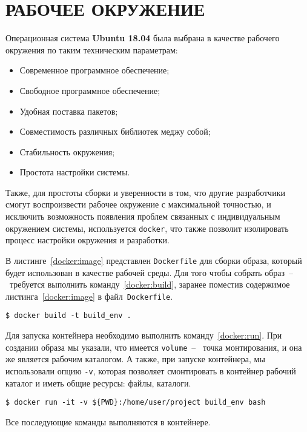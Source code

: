 \chapter{РАБОЧЕЕ ОКРУЖЕНИЕ}


Операционная система \textbf{Ubuntu 18.04} была выбрана в качестве рабочего
окружения по таким техническим параметрам:

\begin{itemize}
    \item Современное программное обеспечение;
    \item Свободное программное обеспечение;
    \item Удобная поставка пакетов;
    \item Совместимость различных библиотек меджу собой;
    \item Стабильность окружения;
    \item Простота настройки системы.
\end{itemize}

Также, для простоты сборки и уверенности в том, что другие разработчики смогут
воспроизвести рабочее окружение с максимальной точностью, и исключить
возможность появления проблем связанных с индивидуальным окружением системы,
используется \texttt{docker}, что также позволит изолировать процесс настройки
окружения и разработки.

В листинге~\ref{docker:image} представлен \texttt{Dockerfile} для сборки образа,
который будет использован в качестве рабочей среды. Для того чтобы собрать
образ~--~требуется выполнить команду~\ref{docker:build}, заранее поместив
содержимое листинга~\ref{docker:image} в файл~\texttt{Dockerfile}.

\begin{lstlisting}[caption={Сборка образа}, label={docker:build}]
$ docker build -t build_env .
\end{lstlisting}

Для запуска контейнера необходимо выполнить команду~\ref{docker:run}. При создании
образа мы указали, что имеется \texttt{volume}~--~ точка монтирования, и она же
является рабочим каталогом. А также, при запуске контейнера, мы использовали
опцию \texttt{-v}, которая позволяет смонтировать в контейнер рабочий каталог и
иметь общие ресурсы: файлы, каталоги.

\begin{lstlisting}[caption={Запуск контейнера}, label={docker:run}]
$ docker run -it -v ${PWD}:/home/user/project build_env bash
\end{lstlisting}

Все последующие команды выполняются в контейнере.
